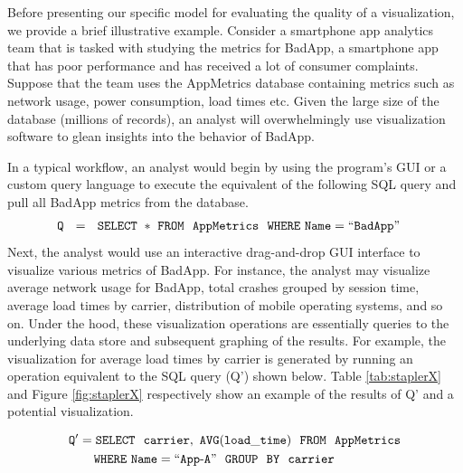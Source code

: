 Before presenting our specific model for evaluating the quality of a visualization, we provide a brief illustrative example.
Consider a smartphone app analytics team that is tasked with studying the metrics for BadApp, a smartphone app that has
poor performance and has received a lot of consumer complaints. 
Suppose that the team uses the AppMetrics database containing metrics such as network usage, 
power consumption, load times etc.
Given the large size of the database (millions of records), an analyst will 
overwhelmingly use visualization software to glean insights into the behavior of BadApp.

In a typical workflow, an analyst would begin by using the program's GUI or a custom query language to execute the equivalent
of the following SQL query and pull all BadApp metrics from the database. 
\noindent 
\begin{align*}
& \tt Q \ \ = \ \ SELECT \ * \ FROM \ \  AppMetrics \ \ WHERE  \ Name=``BadApp"
\end{align*}
Next, the analyst would use an interactive drag-and-drop GUI interface to visualize various metrics of BadApp.
For instance, the analyst may visualize average network usage for BadApp, total crashes grouped by session time,
average load times by carrier, distribution of mobile operating systems, and so on.
Under the hood, these visualization operations are essentially queries to the underlying data store and subsequent graphing of 
the results.
For example, the visualization for average load times by carrier is generated by running an operation equivalent to the
SQL query (Q') shown below.
Table \ref{tab:staplerX} and Figure \ref{fig:staplerX} respectively show an example of the results of Q' and a potential
visualization.

\noindent
\begin{align*}
& \tt Q' = SELECT \ \ carrier,\ AVG(load\_time) \ \ FROM \ \  AppMetrics \\
& \tt \hspace{20pt} WHERE\ Name=``App\text{-}A" \ \ GROUP  \ \ BY \ \ carrier
\end{align*}

